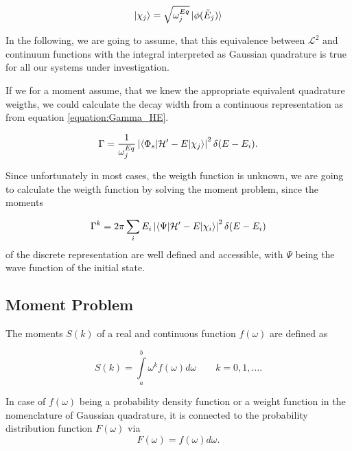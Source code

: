 \begin{equation}
  \ket{\chi_j} = \sqrt{\omega_j^{Eq}} \ket{\phi(\tilde{E}_j)}
\end{equation}

In the following, we are going to assume, that this equivalence between $\mathcal{L}^2$
and continuum functions with the integral interpreted as Gaussian quadrature
is true for all our systems under investigation.

If we for a moment assume, that we knew the appropriate equivalent quadrature
weigths, we could calculate the decay width from a continuous representation as
from equation \ref{equation:Gamma_HE}.

\begin{equation}
  \Gamma = \frac 1{\omega_{j}^{Eq}} \left| \braket{\Phi_s|\mathcal{H}'-E|\chi_j} \right|^2
           \delta(E-E_i).
\end{equation}

Since unfortunately in most cases, the weigth function is unknown, we are going
to calculate the weigth function by solving the moment problem, since the moments

\begin{equation}
  \Gamma^k = 2\pi \sum\limits_i E_i \left| \braket{ \Psi |\mathcal{H}'-E | \chi_i } \right| ^2
           \delta(E-E_i)
\end{equation}
of the discrete representation are well defined and accessible,
with $\Psi$ being the wave function of the initial state.



\subsection{Moment Problem}

The moments $S(k)$ of a real and continuous function $f(\omega)$ are defined
as \cite{MuellerPlathe90}

\begin{equation}
  S(k) = \int\limits_a^b \omega^k f(\omega) d\omega \quad\quad k=0,1,\dots  .
\end{equation}

In case of $f(\omega)$ being a probability density function or a weight function
in the nomenclature of Gaussian quadrature, it is connected
to the probability distribution function $F(\omega)$ via
\begin{equation}
  F(\omega) = f(\omega){d\omega} .
\end{equation}

